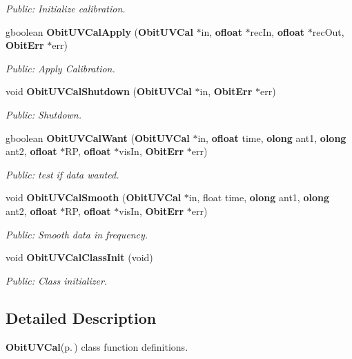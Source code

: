 \begin{CompactItemize}
\begin{CompactList}\small\item\em Public: Initialize calibration. \item\end{CompactList}\item 
gboolean {\bf Obit\-UVCal\-Apply} ({\bf Obit\-UVCal} $\ast$in, {\bf ofloat} $\ast$rec\-In, {\bf ofloat} $\ast$rec\-Out, {\bf Obit\-Err} $\ast$err)
\begin{CompactList}\small\item\em Public: Apply Calibration. \item\end{CompactList}\item 
void {\bf Obit\-UVCal\-Shutdown} ({\bf Obit\-UVCal} $\ast$in, {\bf Obit\-Err} $\ast$err)
\begin{CompactList}\small\item\em Public: Shutdown. \item\end{CompactList}\item 
gboolean {\bf Obit\-UVCal\-Want} ({\bf Obit\-UVCal} $\ast$in, {\bf ofloat} time, {\bf olong} ant1, {\bf olong} ant2, {\bf ofloat} $\ast$RP, {\bf ofloat} $\ast$vis\-In, {\bf Obit\-Err} $\ast$err)
\begin{CompactList}\small\item\em Public: test if data wanted. \item\end{CompactList}\item 
void {\bf Obit\-UVCal\-Smooth} ({\bf Obit\-UVCal} $\ast$in, float time, {\bf olong} ant1, {\bf olong} ant2, {\bf ofloat} $\ast$RP, {\bf ofloat} $\ast$vis\-In, {\bf Obit\-Err} $\ast$err)
\begin{CompactList}\small\item\em Public: Smooth data in frequency. \item\end{CompactList}\item 
void {\bf Obit\-UVCal\-Class\-Init} (void)
\begin{CompactList}\small\item\em Public: Class initializer. \item\end{CompactList}\end{CompactItemize}


\subsection{Detailed Description}
{\bf Obit\-UVCal}{\rm (p.\,\pageref{structObitUVCal})} class function definitions. 

